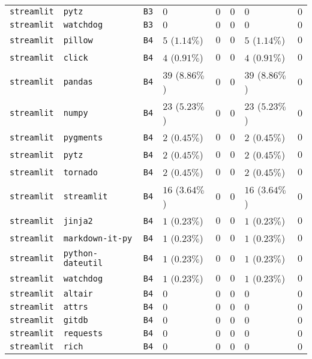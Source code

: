 \begin{table}
\begin{tabular}{llllllll}
\texttt{streamlit} & \texttt{pytz} & \texttt{B3} & $0$ & $0$ & $0$ & $0$ & $0$ \\
\texttt{streamlit} & \texttt{watchdog} & \texttt{B3} & $0$ & $0$ & $0$ & $0$ & $0$ \\
\texttt{streamlit} & \texttt{pillow} & \texttt{B4} & $5$ ($1.14\%$) & $0$ & $0$ & $5$ ($1.14\%$) & $0$ \\
\texttt{streamlit} & \texttt{click} & \texttt{B4} & $4$ ($0.91\%$) & $0$ & $0$ & $4$ ($0.91\%$) & $0$ \\
\texttt{streamlit} & \texttt{pandas} & \texttt{B4} & $39$ ($8.86\%$) & $0$ & $0$ & $39$ ($8.86\%$) & $0$ \\
\texttt{streamlit} & \texttt{numpy} & \texttt{B4} & $23$ ($5.23\%$) & $0$ & $0$ & $23$ ($5.23\%$) & $0$ \\
\texttt{streamlit} & \texttt{pygments} & \texttt{B4} & $2$ ($0.45\%$) & $0$ & $0$ & $2$ ($0.45\%$) & $0$ \\
\texttt{streamlit} & \texttt{pytz} & \texttt{B4} & $2$ ($0.45\%$) & $0$ & $0$ & $2$ ($0.45\%$) & $0$ \\
\texttt{streamlit} & \texttt{tornado} & \texttt{B4} & $2$ ($0.45\%$) & $0$ & $0$ & $2$ ($0.45\%$) & $0$ \\
\texttt{streamlit} & \texttt{streamlit} & \texttt{B4} & $16$ ($3.64\%$) & $0$ & $0$ & $16$ ($3.64\%$) & $0$ \\
\texttt{streamlit} & \texttt{jinja2} & \texttt{B4} & $1$ ($0.23\%$) & $0$ & $0$ & $1$ ($0.23\%$) & $0$ \\
\texttt{streamlit} & \texttt{markdown-it-py} & \texttt{B4} & $1$ ($0.23\%$) & $0$ & $0$ & $1$ ($0.23\%$) & $0$ \\
\texttt{streamlit} & \texttt{python-dateutil} & \texttt{B4} & $1$ ($0.23\%$) & $0$ & $0$ & $1$ ($0.23\%$) & $0$ \\
\texttt{streamlit} & \texttt{watchdog} & \texttt{B4} & $1$ ($0.23\%$) & $0$ & $0$ & $1$ ($0.23\%$) & $0$ \\
\texttt{streamlit} & \texttt{altair} & \texttt{B4} & $0$ & $0$ & $0$ & $0$ & $0$ \\
\texttt{streamlit} & \texttt{attrs} & \texttt{B4} & $0$ & $0$ & $0$ & $0$ & $0$ \\
\texttt{streamlit} & \texttt{gitdb} & \texttt{B4} & $0$ & $0$ & $0$ & $0$ & $0$ \\
\texttt{streamlit} & \texttt{requests} & \texttt{B4} & $0$ & $0$ & $0$ & $0$ & $0$ \\
\texttt{streamlit} & \texttt{rich} & \texttt{B4} & $0$ & $0$ & $0$ & $0$ & $0$ \\

\end{tabular}
\end{table}
